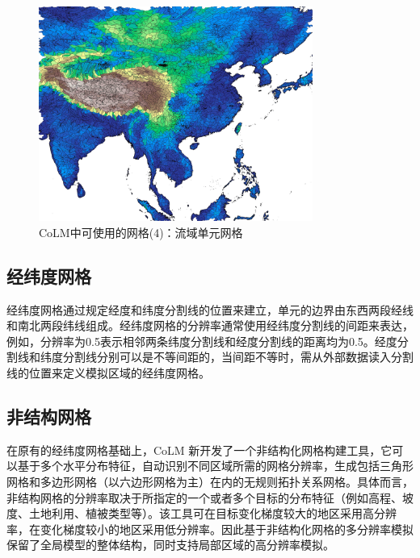  {
\begin{figure}[htbp]
\centering
\includegraphics[width=0.8\textwidth]{Figures/模式构架/网格-流域.jpg}
\caption{CoLM中可使用的网格(4)：流域单元网格}
\label{fig:流域单元网格}
\end{figure}
}

\subsection{经纬度网格}\label{经纬度网格}
经纬度网格通过规定经度和纬度分割线的位置来建立，单元的边界由东西两段经线和南北两段纬线组成。经纬度网格的分辨率通常使用经纬度分割线的间距来表达，例如，分辨率为0.5\textdegree 表示相邻两条纬度分割线和经度分割线的距离均为0.5\textdegree。经度分割线和纬度分割线分别可以是不等间距的，当间距不等时，需从外部数据读入分割线的位置来定义模拟区域的经纬度网格。

\subsection{非结构网格}\label{非结构网格}
在原有的经纬度网格基础上，CoLM 新开发了一个非结构化网格构建工具，它可以基于多个水平分布特征，自动识别不同区域所需的网格分辨率，生成包括三角形网格和多边形网格（以六边形网格为主）在内的无规则拓扑关系网格。具体而言，非结构网格的分辨率取决于所指定的一个或者多个目标的分布特征（例如高程、坡度、土地利用、植被类型等）。该工具可在目标变化梯度较大的地区采用高分辨率，在变化梯度较小的地区采用低分辨率。因此基于非结构化网格的多分辨率模拟保留了全局模型的整体结构，同时支持局部区域的高分辨率模拟。

